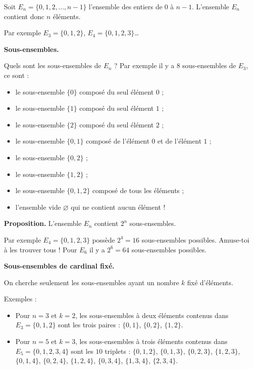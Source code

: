 \documentclass[11pt,class=report,crop=false]{standalone}
\begin{document}
\begin{cours}

Soit $E_n = \{0,1,2,\ldots,n-1\}$ l'ensemble des entiers de $0$ à $n-1$. L'ensemble $E_n$ contient donc $n$ éléments.

Par exemple $E_3 = \{ 0,1,2 \}$, $E_4 = \{ 0,1,2,3 \}$\ldots

\bigskip

\textbf{Sous-ensembles.}

Quels sont les sous-ensembles de $E_n$ ? Par exemple il y a $8$ sous-ensembles de $E_3$, ce sont :
    \begin{itemize}
      \item le sous-ensemble $\{0\}$ composé du seul élément $0$ ;
      \item le sous-ensemble $\{1\}$ composé du seul élément $1$ ;      
      \item le sous-ensemble $\{2\}$ composé du seul élément $2$ ; 
      \item le sous-ensemble $\{0,1\}$ composé de l'élément $0$ et de l'élément $1$ ;           
      \item le sous-ensemble $\{0,2\}$ ;
      \item le sous-ensemble $\{1,2\}$ ; 
      \item le sous-ensemble $\{0, 1,2\}$ composé de tous les éléments ;
      \item l'ensemble vide $\varnothing$ qui ne contient aucun élément !    
    \end{itemize} 

\medskip

\textbf{Proposition.} L'ensemble $E_n$ contient $2^n$ sous-ensembles.

\medskip

Par exemple $E_4 = \{ 0,1,2,3 \}$ possède $2^4 = 16$ sous-ensembles possibles. Amuse-toi à les trouver tous ! Pour $E_6$ il y a $2^6 = 64$  sous-ensembles possibles.

\bigskip

\textbf{Sous-ensembles de cardinal fixé.}

On cherche seulement les sous-ensembles ayant un nombre $k$ fixé d'éléments.

Exemples :
\begin{itemize}
  \item Pour $n = 3$ et $k = 2$, les sous-ensembles à deux éléments contenus dans $E_3 = \{ 0,1,2 \}$ sont les trois paires : $\{0,1\}$, $\{0,2\}$, $\{1,2\}$.

  \item Pour $n = 5$ et $k = 3$, les sous-ensembles à trois éléments contenus dans $E_5 = \{ 0,1,2,3,4 \}$ sont les $10$ triplets :
  $\{0, 1, 2\}$, $\{0, 1, 3\}$, $\{0, 2, 3\}$, $\{1, 2, 3\}$, $\{0, 1, 4\}$, $\{0, 2, 4\}$, $\{1, 2, 4\}$, $\{0, 3, 4\}$, $\{1, 3, 4\}$, $\{2, 3, 4\}$.
  
\end{itemize}

\end{cours}
\end{document}
